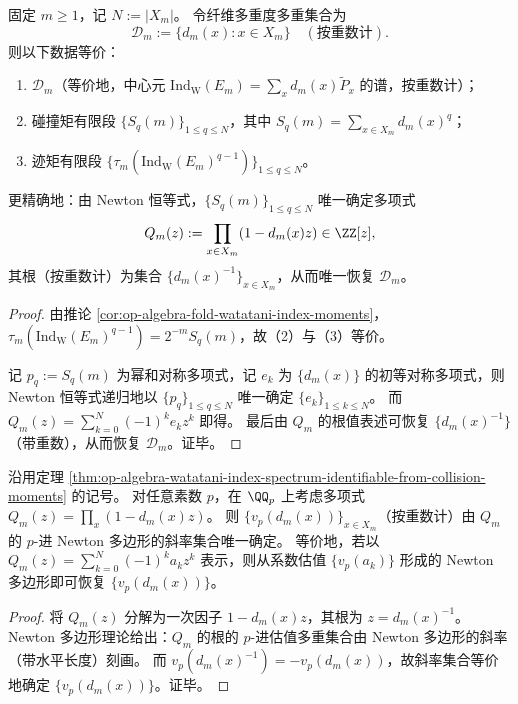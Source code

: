 \begin{theorem}[碰撞矩 \texorpdfstring{$\Rightarrow$}{=>} 指数场谱的可辨识性]\label{thm:op-algebra-watatani-index-spectrum-identifiable-from-collision-moments}
固定 \(m\ge 1\)，记 \(N:=|X_m|\)。
令纤维多重度多重集合为
\[
\mathcal D_m:=\{d_m(x):x\in X_m\}\quad(\text{按重数计}).
\]
则以下数据等价：
\begin{enumerate}
  \item \(\mathcal D_m\)（等价地，中心元 \(\mathrm{Ind}_{\mathrm W}(E_m)=\sum_{x}d_m(x)\widetilde P_x\) 的谱，按重数计）；
  \item 碰撞矩有限段 \(\{S_q(m)\}_{1\le q\le N}\)，其中 \(S_q(m)=\sum_{x\in X_m}d_m(x)^q\)；
  \item 迹矩有限段 \(\{\tau_m(\mathrm{Ind}_{\mathrm W}(E_m)^{q-1})\}_{1\le q\le N}\)。
\end{enumerate}
更精确地：由 Newton 恒等式，\(\{S_q(m)\}_{1\le q\le N}\) 唯一确定多项式
\[
Q_m(z):=\prod_{x\in X_m}(1-d_m(x)z)\in\ZZ[z],
\]
其根（按重数计）为集合 \(\{d_m(x)^{-1}\}_{x\in X_m}\)，从而唯一恢复 \(\mathcal D_m\)。
\end{theorem}
\begin{proof}
由推论 \ref{cor:op-algebra-fold-watatani-index-moments}，
\(
\tau_m(\mathrm{Ind}_{\mathrm W}(E_m)^{q-1})=2^{-m}S_q(m)
\)，故（2）与（3）等价。
\par
记 \(p_q:=S_q(m)\) 为幂和对称多项式，记 \(e_k\) 为 \(\{d_m(x)\}\) 的初等对称多项式，则 Newton 恒等式递归地以 \(\{p_q\}_{1\le q\le N}\) 唯一确定 \(\{e_k\}_{1\le k\le N}\)。
而
\(
Q_m(z)=\sum_{k=0}^{N}(-1)^k e_k z^k
\)
即得。
最后由 \(Q_m\) 的根值表述可恢复 \(\{d_m(x)^{-1}\}\)（带重数），从而恢复 \(\mathcal D_m\)。证毕。
\end{proof}

\begin{proposition}\label{prop:op-algebra-watatani-index-newton-polygon-padic-audit}
沿用定理 \ref{thm:op-algebra-watatani-index-spectrum-identifiable-from-collision-moments} 的记号。
对任意素数 \(p\)，在 \(\QQ_p\) 上考虑多项式 \(Q_m(z)=\prod_{x}(1-d_m(x)z)\)。
则 \(\{v_p(d_m(x))\}_{x\in X_m}\)（按重数计）由 \(Q_m\) 的 \(p\)-进 Newton 多边形的斜率集合唯一确定。
等价地，若以 \(Q_m(z)=\sum_{k=0}^{N}(-1)^k a_k z^k\) 表示，则从系数估值 \(\{v_p(a_k)\}\) 形成的 Newton 多边形即可恢复 \(\{v_p(d_m(x))\}\)。
\end{proposition}
\begin{proof}
将 \(Q_m(z)\) 分解为一次因子 \(1-d_m(x)z\)，其根为 \(z=d_m(x)^{-1}\)。
Newton 多边形理论给出：\(Q_m\) 的根的 \(p\)-进估值多重集合由 Newton 多边形的斜率（带水平长度）刻画。
而 \(v_p(d_m(x)^{-1})=-v_p(d_m(x))\)，故斜率集合等价地确定 \(\{v_p(d_m(x))\}\)。证毕。
\end{proof}

